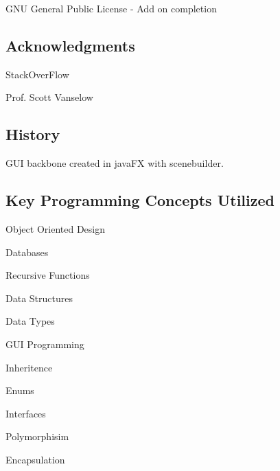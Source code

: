 G\+NU General Public License -\/ Add on completion \subsection*{Acknowledgments}


\begin{DoxyItemize}
\item Stack\+Over\+Flow
\item Prof. Scott Vanselow \subsection*{History}
\end{DoxyItemize}

G\+UI backbone created in java\+FX with scenebuilder. \subsection*{Key Programming Concepts Utilized}


\begin{DoxyItemize}
\item Object Oriented Design
\item Databases
\item Recursive Functions
\item Data Structures
\item Data Types
\item G\+UI Programming
\item Inheritence
\item Enums
\item Interfaces
\item Polymorphisim
\item Encapsulation 
\end{DoxyItemize}